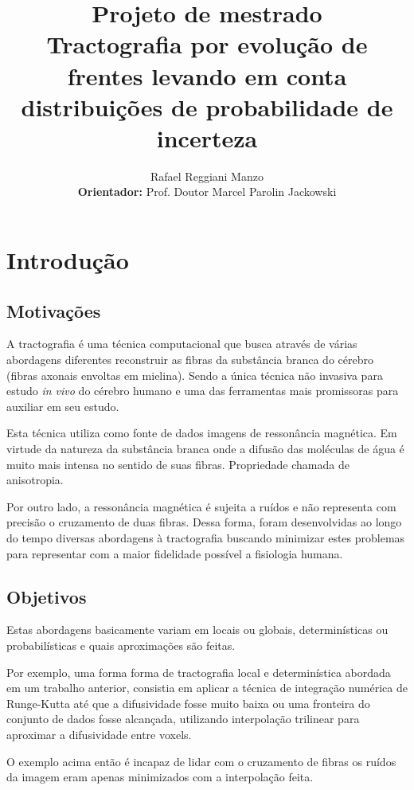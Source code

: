 \documentclass[a4paper,11pt]{report}
\title{Projeto de mestrado\\
       \textbf{Tractografia por evolução de frentes levando em conta distribuições de probabilidade de incerteza}}
\author{Rafael Reggiani Manzo\\
        \textbf{Orientador:} Prof. Doutor Marcel Parolin Jackowski}
\begin{document}
\maketitle
\tableofcontents

\begin{abstract}
\end{abstract}

\chapter{Introdução}
  \section{Motivações}
  A tractografia é uma técnica computacional que busca através de várias abordagens diferentes reconstruir as fibras da substância branca do cérebro (fibras axonais envoltas em mielina). Sendo a única técnica não invasiva para estudo \textit{in vivo} do cérebro humano e uma das ferramentas mais promissoras para auxiliar em seu estudo.
  
  Esta técnica utiliza como fonte de dados imagens de ressonância magnética. Em virtude da natureza da substância branca onde a difusão das moléculas de água é muito mais intensa no sentido de suas fibras. Propriedade chamada de anisotropia.
  
  Por outro lado, a ressonância magnética é sujeita a ruídos e não representa com precisão o cruzamento de duas fibras. Dessa forma, foram desenvolvidas ao longo do tempo diversas abordagens à tractografia buscando minimizar estes problemas para representar com a maior fidelidade possível a fisiologia humana.
  
  \section{Objetivos}
  Estas abordagens basicamente variam em locais ou globais, determinísticas ou probabilísticas e quais aproximações são feitas. 
  
  Por exemplo, uma forma forma de tractografia local e determinística abordada em um trabalho anterior, consistia em aplicar a técnica de integração numérica de Runge-Kutta até que a difusividade fosse muito baixa ou uma fronteira do conjunto de dados fosse alcançada, utilizando interpolação trilinear para aproximar a difusividade entre voxels.
  
  O exemplo acima então é incapaz de lidar com o cruzamento de fibras os ruídos da imagem eram apenas minimizados com a interpolação feita.
  
\end{document}
